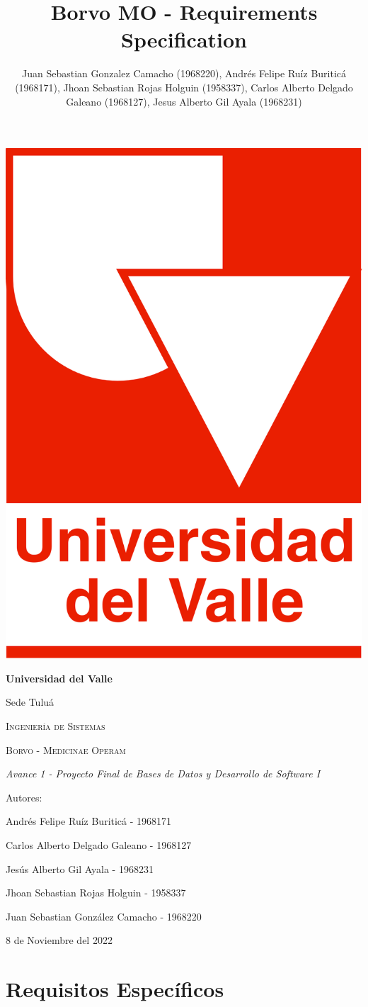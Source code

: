 \documentclass[12pt,a4paper]{article}
\author{Juan Sebastian Gonzalez Camacho (1968220), Andrés Felipe Ruíz Buriticá (1968171), Jhoan Sebastian Rojas Holguin (1958337), Carlos Alberto Delgado Galeano (1968127), Jesus Alberto Gil Ayala (1968231)}
\title{Borvo MO - Requirements Specification}
\begin{document}
\begin{titlepage}
\centering
{\includegraphics[width=0.18 \textwidth]{logo.png} \par}
\vfill
{\bfseries\LARGE Universidad del Valle\par}
{\Large Sede Tuluá\par}
\vfill
{\scshape\Large Ingeniería de Sistemas \par}
\vfill
{\scshape\Huge Borvo - Medicinae Operam \par}
\vfill
{\itshape\Large Avance 1 - Proyecto Final de Bases de Datos y Desarrollo de Software I \par}
\vfill
{\Large Autores: \par}
{\Large Andrés Felipe Ruíz Buriticá - 1968171 \par}
{\Large Carlos Alberto Delgado Galeano - 1968127 \par}
{\Large Jesús Alberto Gil Ayala - 1968231 \par}
{\Large Jhoan Sebastian Rojas Holguin - 1958337 \par}
{\Large Juan Sebastian González Camacho - 1968220 \par}
\vfill
{\Large 8 de Noviembre del 2022 \par}
\end{titlepage}
\tableofcontents
\newpage
\section{Requisitos Específicos}
\end{document}
